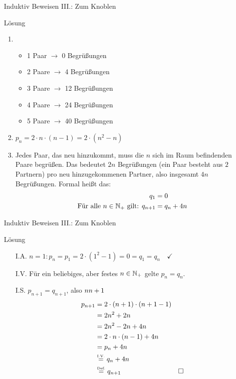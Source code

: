 \begin{frame}{Induktiv Beweisen III.: Zum Knoblen}
	\begin{block}{Lösung}
		\begin{enumerate}
			\item \begin{itemize}
				\item 1 Paar $\rightarrow$ 0 Begrüßungen
				\item 2 Paare $\rightarrow$ 4 Begrüßungen
				\item 3 Paare $\rightarrow$ 12 Begrüßungen
				\item 4 Paare $\rightarrow$ 24 Begrüßungen
				\item 5 Paare $\rightarrow$ 40 Begrüßungen
			\end{itemize}
			\item $p_n = 2 \cdot n \cdot (n-1) = 2 \cdot (n^2 -n)$
			\item Jedes Paar, das neu hinzukommt, muss die $n$ sich im Raum befindenden Paare begrüßen. Das bedeutet $2n$ Begrüßungen (ein Paar besteht aus $2$ Partnern) pro neu hinzugekommenen Partner, also insgesamt $4n$ Begrüßungen. Formal heißt das: 
			\begin{align*}
				q_1 &= 0 \\
				\text{Für alle } n \in \mathbb{N}_+ \text{ gilt: } q_{n+1} &= q_n + 4n
			\end{align*}
		\end{enumerate}
	\end{block}
\end{frame}

\begin{frame}{Induktiv Beweisen III.: Zum Knoblen}
	\begin{block}{Lösung}
		\begin{itemize}
			\item[I.A.] $n=1: p_n = p_1 = 2 \cdot (1^2 -1 ) = 0 = q_1 = q_n \quad \checkmark$
			\item[I.V.] Für ein beliebiges, aber festes $n \in \mathbb{N}_+$ gelte $p_n=q_n$.
			\item[I.S.] \zz $p_{n+1}=q_{n+1}$, also $n \notStephan{\leadsto} \Stephan{\curvearrowright} n+1$
			\begin{align*}
				p_{n+1} &= 2 \cdot (n+1) \cdot (n+1-1) \\
						&= 2n^2 + 2n \\
						&= 2n^2 -2n + 4n \\
						&= 2 \cdot n \cdot (n-1) + 4n \\
						&= p_n + 4n \\
						&\eqtext{I.V.} q_n + 4n \\
						&\eqtext{Def.} q_{n+1} & \qedwhite{}
			\end{align*}

		\end{itemize}
	\end{block}
\end{frame}




